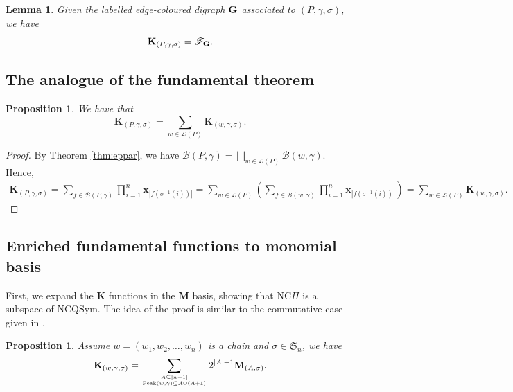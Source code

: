 \documentclass[11pt]{amsart}
\newtheorem{Lemma}[Theorem]{Lemma}
\newtheorem{Example}[Theorem]{Example}
\newtheorem{Proposition}[Theorem]{Proposition}
\numberwithin{equation}{section}
\newcommand{\NCQSym}{\mathrm{NCQSym}}
\newcommand{\peak}{\mathrm{Peak}}
\newcommand{\NCPeak}{\mathrm{NC}\Pi}
\newcommand{\scrF}{{\mathscr{F}}}
\newcommand{\bfK}{{\mathbf{K}}}
\newcommand{\bfG}{{\mathbf{G}}}
\begin{document}
\begin{Lemma}  Given the labelled edge-coloured digraph ${\bf G}$ associated to $(P,\gamma,\sigma)$, we have 
	$$\bfK_{(P,\gamma,\sigma)}=\scrF_{\bf G}.$$
	\end{Lemma} 
	
	

	

	
\subsection{The analogue of the fundamental theorem}\label{subsec:fun-thm-en}


\begin{Proposition}\label{prop:fund2} We have that
	$$\mathbf{K}_{(P,\gamma,\sigma)}=\sum_{w\in\mathcal{L}(P)}\mathbf{K}_{(w,\gamma,\sigma)}.$$
\end{Proposition}

\begin{proof}
	By Theorem \ref{thm:eppar}, we have $\mathcal{B}(P,\gamma)=\bigsqcup_{w\in\mathcal{L}(P)}\mathcal{B}(w,\gamma)$. Hence,
	\begin{align*}
	\mathbf{K}_{(P,\gamma,\sigma)}=\sum_{f\in\mathcal{B}(P,\gamma)}\prod_{i=1}^{n}\mathbf{x}_{|f(\sigma^{-1}(i))|}=\sum_{w\in\mathcal{L}(P)}\left(\sum_{f\in\mathcal{B}(w,\gamma)}\prod_{i=1}^n\mathbf{x}_{|f(\sigma^{-1}(i))|}\right)=\sum_{w\in\mathcal{L}(P)}\mathbf{K}_{(w,\gamma,\sigma)}.
	\end{align*}
\end{proof}

\subsection{Enriched fundamental functions to monomial basis}\label{subsec:peak-to-M}


First, we expand the $\mathbf{K}$ functions in the $\mathbf{M}$ basis, showing that $\NCPeak$ is a subspace of $\NCQSym$. The idea of the proof is similar to the commutative case given in \cite{S97}.

\begin{Proposition}\label{prop:KtoM}
	Assume $w=(w_1,w_2,\dots,w_n)$ is a chain and $\sigma\in\mathfrak{S}_n$, we have
	$$\mathbf{K}_{(w,\gamma,\sigma)}=\sum_{A\subseteq[n-1] \atop \peak(w,\gamma)\subseteq A\cup (A+1)} 2^{|A|+1}\mathbf{M}_{(A,\sigma)}.$$
	\end{Proposition}
\end{document}
